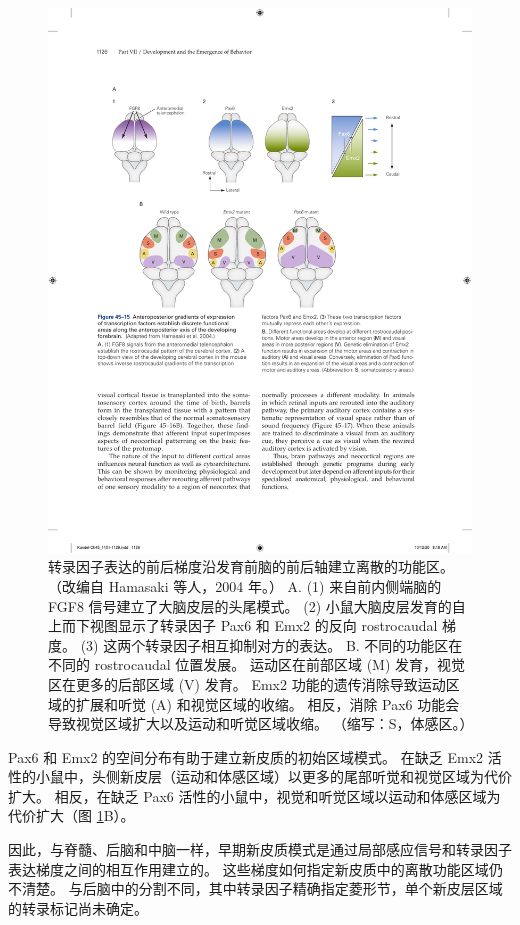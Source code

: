 \begin{figure}[htbp]
	\centering
	\includegraphics[width=0.9\linewidth]{chap45/fig_45_15}
	\caption{转录因子表达的前后梯度沿发育前脑的前后轴建立离散的功能区。 （改编自 Hamasaki 等人，2004 年。） A. (1) 来自前内侧端脑的 FGF8 信号建立了大脑皮层的头尾模式。 (2) 小鼠大脑皮层发育的自上而下视图显示了转录因子 Pax6 和 Emx2 的反向 rostrocaudal 梯度。 (3) 这两个转录因子相互抑制对方的表达。 B. 不同的功能区在不同的 rostrocaudal 位置发展。 运动区在前部区域 (M) 发育，视觉区在更多的后部区域 (V) 发育。 Emx2 功能的遗传消除导致运动区域的扩展和听觉 (A) 和视觉区域的收缩。 相反，消除 Pax6 功能会导致视觉区域扩大以及运动和听觉区域收缩。 （缩写：S，体感区。）}
	\label{fig:45_15}
\end{figure}

Pax6 和 Emx2 的空间分布有助于建立新皮质的初始区域模式。 在缺乏 Emx2 活性的小鼠中，头侧新皮层（运动和体感区域）以更多的尾部听觉和视觉区域为代价扩大。 相反，在缺乏 Pax6 活性的小鼠中，视觉和听觉区域以运动和体感区域为代价扩大（图 \ref{fig:45_15}B）。

因此，与脊髓、后脑和中脑一样，早期新皮质模式是通过局部感应信号和转录因子表达梯度之间的相互作用建立的。 这些梯度如何指定新皮质中的离散功能区域仍不清楚。 与后脑中的分割不同，其中转录因子精确指定菱形节，单个新皮层区域的转录标记尚未确定。

